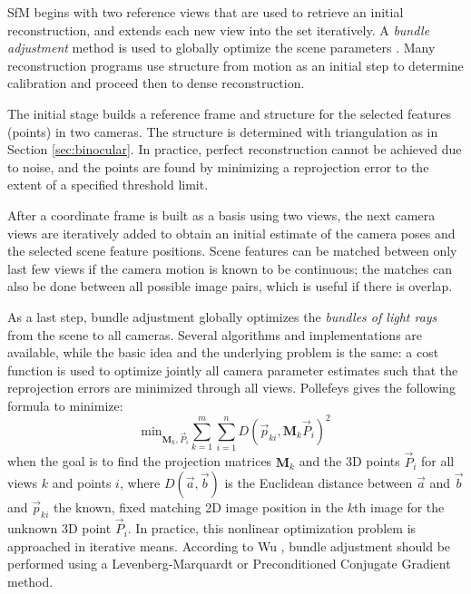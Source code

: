 SfM begins with two reference views that are used to retrieve an initial reconstruction, and extends each new view into the set iteratively.
A \emph{bundle adjustment} method is used to globally optimize the scene parameters \cite{triggs2000bundle}.
Many reconstruction programs use structure from motion as an initial step to determine calibration and proceed then to dense reconstruction.

The initial stage builds a reference frame and structure for the selected features (points) in two cameras.
The structure is determined with triangulation as in Section \ref{sec:binocular}.
In practice, perfect reconstruction cannot be achieved due to noise, and the points are found by minimizing a reprojection error to the extent of a specified threshold limit.

After a coordinate frame is built as a basis using two views, the next camera views are iteratively added to obtain an initial estimate of the camera poses and the selected scene feature positions.
Scene features can be matched between only last few views if the camera motion is known to be continuous;
the matches can also be done between all possible image pairs, which is useful if there is overlap.

As a last step, bundle adjustment globally optimizes the \emph{bundles of light rays} from the scene to all cameras.
Several algorithms and implementations are available, while the basic idea and the underlying problem is the same:
a cost function is used to optimize jointly all camera parameter estimates such that the reprojection errors are minimized through all views.
Pollefeys \cite{pollefeys2004visual} gives the following formula to minimize:
\begin{equation}
	\text{min}_{\bm M_k, \vec P_i} \sum_{k=1}^m \sum_{i=1}^n D(\vec p_{ki}, \bm M_k \vec P_i)^2
\end{equation}
when the goal is to find the projection matrices $\bm M_k$ and the 3D points $\vec P_i$ for all views $k$ and points $i$, where $D(\vec a,\vec b)$ is the Euclidean distance between $\vec a$ and $\vec b$ and $\vec p_{ki}$ the known, fixed matching 2D image position in the $k$th image for the unknown 3D point $\vec P_i$.
In practice, this nonlinear optimization problem is approached in iterative means.
According to Wu \cite{wu2013towards}, bundle adjustment should be performed using a Levenberg-Marquardt or Preconditioned Conjugate Gradient method.

